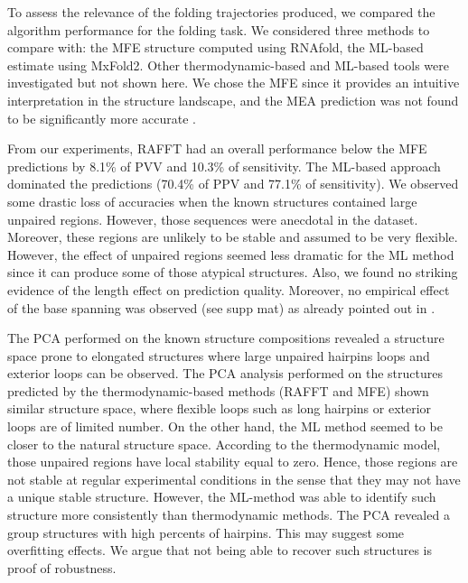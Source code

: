 \documentclass[a4paper,12pt]{article}
\begin{document}
{{To assess the relevance of the folding trajectories produced, we compared the
algorithm performance for the folding task. We considered three methods to
compare with: the MFE structure computed using RNAfold, the ML-based estimate
using MxFold2. Other thermodynamic-based and ML-based tools were investigated
but not shown here. We chose the MFE since it provides an intuitive
interpretation in the structure landscape, and the MEA prediction was not found
to be significantly more accurate \cite{mathews19_how_to_bench_rna_secon}.

From our experiments, RAFFT had an overall performance below the MFE predictions
by 8.1\% of PVV and 10.3\% of sensitivity. The ML-based approach dominated the
predictions (70.4\% of PPV and 77.1\% of sensitivity). We observed some drastic
loss of accuracies when the known structures contained large unpaired regions.
However, those sequences were anecdotal in the dataset. Moreover, these regions
are unlikely to be stable and assumed to be very flexible. However, the effect
of unpaired regions seemed less dramatic for the ML method since it can produce
some of those atypical structures. Also, we found no striking evidence of the
length effect on prediction quality. Moreover, no empirical effect of the base
spanning was observed (see supp mat) as already pointed out in
\cite{amman13_troub_long_range_base_pairs_rna_foldin}.

The PCA performed on the known structure compositions revealed a structure space
prone to elongated structures where large unpaired hairpins loops and exterior
loops can be observed. The PCA analysis performed on the structures predicted by
the thermodynamic-based methods (RAFFT and MFE) shown similar structure space,
where flexible loops such as long hairpins or exterior loops are of limited
number. On the other hand, the ML method seemed to be closer to the natural
structure space. According to the thermodynamic model, those unpaired regions
have local stability equal to zero. Hence, those regions are not stable at
regular experimental conditions in the sense that they may not have a unique
stable structure. However, the ML-method was able to identify such structure
more consistently than thermodynamic methods. The PCA revealed a group
structures with high percents of hairpins. This may suggest some overfitting
effects. We argue that not being able to recover such structures is proof of
robustness.

}}
\end{document}
